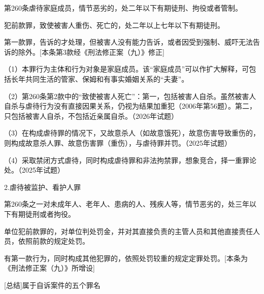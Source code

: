 第260条虐待家庭成员，情节恶劣的，处二年以下有期徒刑、拘役或者管制。

犯前款罪，致使被害人重伤、死亡的，处二年以上七年以下有期徒刑。

第一款罪，告诉的才处理，但被害人没有能力告诉，或者因受到强制、威吓无法告诉的除外。[本条第3款经《刑法修正案（九）》修正]

（1）本罪行为主体和行为对象是家庭成员。该“家庭成员”可以作扩大解释，可包括长年共同生活的管家、保姆和有事实婚姻关系的“夫妻”。

（2）第260条第2款中的“致使被害人死亡”：第一，包括被害人自杀。虽然被害人自杀与虐待行为没有直接因果关系，仍视为结果加重犯（2006年第56题）。第二，只包括被害人自杀，不包括近亲属自杀。（2026年试题）

（3）在构成虐待罪的情况下，又故意杀人（如故意饿死），故意伤害导致重伤的，则构成故意杀人罪、故意伤害罪（重伤），与虐待罪并罚。（2025年试题）

（4）采取禁闭方式虐待，同时构成虐待罪和非法拘禁罪，想象竞合，择一重罪论处。（2025年试题）

2.虐待被监护、看护人罪

第260条之一对未成年人、老年人、患病的人、残疾人等，情节恶劣的，处三年以下有期徒刑或者拘役。

单位犯前款罪的，对单位判处罚金，并对其直接负责的主管人员和其他直接责任人员，依照前款的规定处罚。

有第一款行为，同时构成其他犯罪的，依照处罚较重的规定定罪处罚。[本条为《刑法修正案（九）》所增设]


[总结]属于自诉案件的五个罪名

